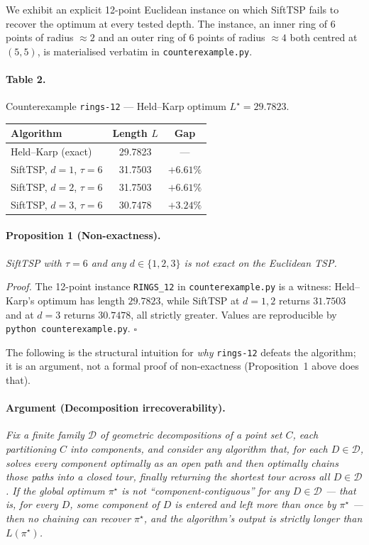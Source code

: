\documentclass[11pt,a4paper]{article}
\begin{document}
We exhibit an explicit 12-point Euclidean instance on which SiftTSP
fails to recover the optimum at every tested depth. The instance, an
inner ring of 6 points of radius $\approx 2$ and an outer ring of 6
points of radius $\approx 4$ both centred at $(5,5)$, is materialised
verbatim in \texttt{counterexample.py}.

\paragraph{Table 2.} Counterexample \texttt{rings-12} --- Held--Karp
optimum $L^{\star} = 29.7823$.

\begin{center}
\begin{tabular}{lcc}
\toprule
Algorithm & Length $L$ & Gap \\
\midrule
Held--Karp (exact)            & 29.7823 & --- \\
SiftTSP, $d=1$, $\tau=6$      & 31.7503 & $+6.61\%$ \\
SiftTSP, $d=2$, $\tau=6$      & 31.7503 & $+6.61\%$ \\
SiftTSP, $d=3$, $\tau=6$      & 30.7478 & $+3.24\%$ \\
\bottomrule
\end{tabular}
\end{center}

\paragraph{Proposition 1 (Non-exactness).} \textit{SiftTSP with
$\tau = 6$ and any $d \in \{1, 2, 3\}$ is not exact on the Euclidean
TSP.}

\textit{Proof.} The 12-point instance \texttt{RINGS\_12} in
\texttt{counterexample.py} is a witness: Held--Karp's optimum has
length $29.7823$, while SiftTSP at $d=1,2$ returns $31.7503$ and at
$d=3$ returns $30.7478$, all strictly greater. Values are reproducible
by \texttt{python counterexample.py}. $\square$

The following is the structural intuition for \emph{why} \texttt{rings-12}
defeats the algorithm; it is an argument, not a formal proof of
non-exactness (Proposition~1 above does that).

\paragraph{Argument (Decomposition irrecoverability).}
\textit{Fix a finite family $\mathcal{D}$ of geometric decompositions
of a point set $C$, each partitioning $C$ into components, and consider
any algorithm that, for each $D \in \mathcal{D}$, solves every
component optimally as an open path and then optimally chains those
paths into a closed tour, finally returning the shortest tour across
all $D \in \mathcal{D}$. If the global optimum $\pi^{\star}$ is not
``component-contiguous'' for any $D \in \mathcal{D}$ --- that is, for
every $D$, some component of $D$ is entered and left more than once by
$\pi^{\star}$ --- then no chaining can recover $\pi^{\star}$, and the
algorithm's output is strictly longer than $L(\pi^{\star})$.}
\end{document}
